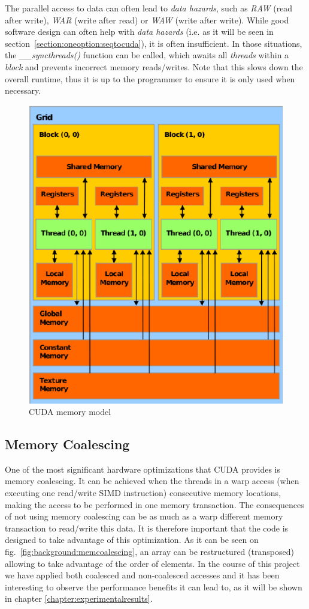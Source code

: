 The parallel access to data can often lead to \textit{data hazards}, such as \textit{RAW} (read after write), \textit{WAR} (write after read) or \textit{WAW} (write after write). While good software design can often help with \textit{data hazards} (i.e. as it will be seen in section~\ref{section:oneoption:seqtocuda}), it is often insufficient. In those situations, the \textit{\_\_syncthreads()} function can be called, which awaits all \textit{threads} within a \textit{block} and prevents incorrect memory reads/writes. Note that this slows down the overall runtime, thus it is up to the programmer to ensure it is only used when necessary.

\begin{figure}[H]
	\centering
	\includegraphics[width=.7\textwidth]{img/cudamemory.png}
	\caption{CUDA memory model}
	\label{fig:background:cudamemory}
\end{figure}

\subsection{Memory Coalescing}
One of the most significant hardware optimizations that CUDA provides is memory coalescing. It can be achieved when the threads in a warp access (when executing one read/write SIMD instruction) consecutive memory locations, making the access to be performed in one memory transaction. The consequences of not using memory coalescing can be as much as a warp different memory transaction to read/write this data. It is therefore important that the code is designed to take advantage of this optimization. As it can be seen on fig.~\ref{fig:background:memcoalescing}, an array can be restructured (transposed) allowing to take advantage of the order of elements. In the course of this project we have applied both coalesced and non-coalesced accesses and it has been interesting to observe the performance benefits it can lead to, as it will be shown in chapter \ref{chapter:experimentalresults}. 

